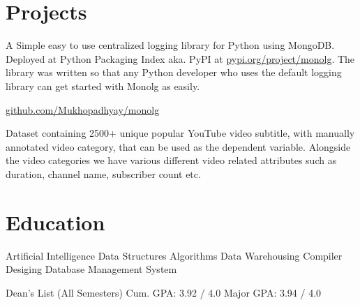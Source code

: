 \documentclass[]{deedy-resume-openfont}
\begin{document}
\sectionsep


\section{Projects}

A Simple easy to use centralized logging library for Python using MongoDB. Deployed at Python Packaging Index aka. PyPI at \href{https://pypi.org/project/monolg/}{pypi.org/project/monolg}. The library was written so that any Python developer who uses the default logging library can get started with Monolg as easily.

\href{https://github.com/Mukhopadhyay/monolg}{ github.com/Mukhopadhyay/monolg}

\sectionsep


Dataset containing 2500+ unique popular YouTube video subtitle, with manually annotated video category, that can be used as the dependent variable. Alongside the video categories we have various different video related attributes such as duration, channel name, subscriber count etc.

\href{https://www.kaggle.com/datasets/praneshmukhopadhyay/youtubers-saying-things}{ }

\sectionsep

\section{Education}

Artificial Intelligence \textbullet{} Data Structures \textbullet{} Algorithms \textbullet{} Data Warehousing \textbullet{} Compiler Desiging \textbullet{} Database Management System
\sectionsep

Dean's List (All Semesters) \textbullet{}
Cum. GPA: 3.92 / 4.0 \textbullet{}
Major GPA: 3.94 / 4.0
\end{document}
